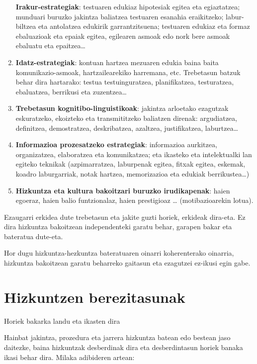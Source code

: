 \documentclass[
]{book}
\begin{document}
\begin{enumerate}
  \textbf{Irakur-estrategiak}: testuaren edukiaz hipotesiak egitea eta egiaztatzea; munduari buruzko jakintza baliatzea testuaren esanahia eraikitzeko; labur-biltzea eta antolatzea edukirik garrantzitsuena; testuaren edukiaz eta formaz ebaluazioak eta epaiak egitea, egilearen asmoak edo nork bere asmoak ebaluatu eta epaitzea\ldots{}
\item
  \textbf{Idatz-estrategiak}: kontuan hartzea mezuaren edukia baina baita komunikazio-asmoak, hartzailearekiko harremana, etc. Trebetasun batzuk behar dira hartarako: testua testuinguratzea, planifikatzea, testuratzea, ebaluatzea, berrikusi eta zuzentzea\ldots{}
\item
  \textbf{Trebetasun kognitibo-linguistikoak}: jakintza arloetako ezagutzak eskuratzeko, ekoizteko eta transmititzeko baliatzen direnak: argudiatzea, definitzea, demostratzea, deskribatzea, azaltzea, justifikatzea, laburtzea\ldots{}
\item
  \textbf{Informazioa prozesatzeko estrategiak}: informazioa aurkitzea, organizatzea, elaboratzea eta komunikatzea; eta ikasteko eta intelektualki lan egiteko teknikak (azpimarratzea, laburpenak egitea, fitxak egitea, eskemak, koadro laburgarriak, notak hartzea, memorizazioa eta edukiak berrikustea\ldots)
\item
  \textbf{Hizkuntza eta kultura bakoitzari buruzko irudikapenak}: haien egoeraz, haien balio funtzionalaz, haien prestigioaz \ldots{} (motibazioarekin lotua).
\end{enumerate}

Ezaugarri erkidea dute trebetasun eta jakite guzti horiek, erkideak dira-eta. Ez dira hizkuntza bakoitzean independenteki garatu behar, garapen bakar eta bateratua dute-eta.

Hor dugu hizkuntza-hezkuntza bateratuaren oinarri koherenterako oinarria, hizkuntza bakoitzean garatu beharreko gaitasun eta ezagutzei ez-ikusi egin gabe.

\hypertarget{hizkuntzen-berezitasunak}{%
\section{Hizkuntzen berezitasunak}\label{hizkuntzen-berezitasunak}}

Horiek bakarka landu eta ikasten dira

Hainbat jakintza, prozedura eta jarrera hizkuntza batean edo bestean jaso daitezke, baina hizkuntzak desberdinak dira eta desberdintasun horiek banaka ikasi behar dira.
Milaka adibideren artean:
\end{document}
